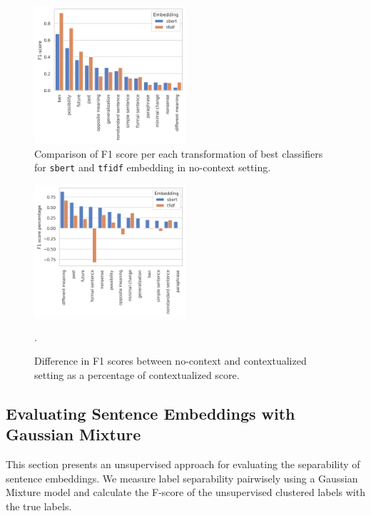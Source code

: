 \documentclass[11pt]{article}
\newcommand{\Embed}[1]{\texttt{#1}}
\begin{document}
\begin{figure}[htp]
  \centering
  \includegraphics[width=0.5\textwidth]{figs/cls_gs_no_context_labels.png}

  \caption{Comparison of F1 score per each transformation of best classifiers
  for \Embed{sbert} and \Embed{tfidf} embedding in no-context
  setting.}\label{fig:cls_gs_no_context_labels}

\end{figure}

\begin{figure}[htp]
  \centering
  \includegraphics[width=0.5\textwidth]{figs/cls_gs_labels_context_diff.png}

  \caption{Difference in F1 scores between no-context and contextualized
  setting as a percentage of contextualized
  score.}\label{fig:cls_gs_labels_context_diff}.

\end{figure}

\subsection{Evaluating Sentence Embeddings with Gaussian Mixture}

This section presents an unsupervised approach for evaluating the separability
of sentence embeddings. We measure label separability pairwisely using a
Gaussian Mixture model and calculate the F-score of the unsupervised clustered
labels with the true labels.
\end{document}
